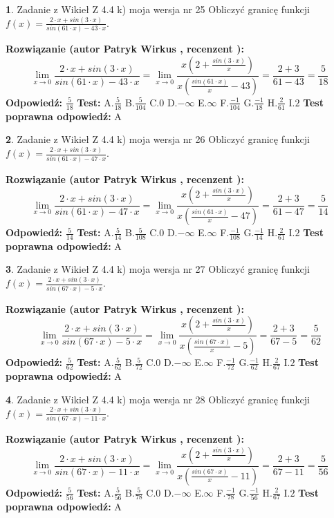 \documentclass[12pt, a4paper]{article}
\theoremstyle{definition} %
\newtheorem{zad}{}
\newcommand{\zadStart}[1]{\begin{zad}#1\newline}
\newcommand{\zadStop}{\end{zad}}
\newcommand{\rozwStart}[2]{\noindent \textbf{Rozwiązanie (autor #1 , recenzent #2): }\newline}
\newcommand{\rozwStop}{\newline}
\newcommand{\odpStart}{\noindent \textbf{Odpowiedź:}\newline}
\newcommand{\odpStop}{\newline}
\newcommand{\testStart}{\noindent \textbf{Test:}\newline}
\newcommand{\testStop}{\newline}
\newcommand{\kluczStart}{\noindent \textbf{Test poprawna odpowiedź:}\newline}
\newcommand{\kluczStop}{\newline}
\begin{document}
\zadStart{Zadanie z Wikieł Z 4.4 k) moja wersja nr 25}
Obliczyć granicę funkcji $f(x)=\frac{2\cdot x +sin(3\cdot x)}{sin(61\cdot x) -43\cdot x}$.
\zadStop
\rozwStart{Patryk Wirkus}{}
$$\lim\limits_{x\to 0}\frac{2\cdot x +sin(3\cdot x)}{sin(61\cdot x) -43\cdot x}
=\lim\limits_{x\to 0}\frac{x(2+\frac{sin(3\cdot x)}{x})}{x(\frac{sin(61\cdot x)}{x}-43)}
=\frac{2+3}{61-43} = \frac{5}{18}$$
\rozwStop
\odpStart
$\frac{5}{18}$
\odpStop
\testStart
A.$\frac{5}{18}$
B.$\frac{5}{104}$
C.$0$
D.$-\infty$
E.$\infty$
F.$\frac{-1}{104}$
G.$\frac{-1}{18}$
H.$\frac{2}{61}$
I.$2$
\testStop
\kluczStart
A
\kluczStop



\zadStart{Zadanie z Wikieł Z 4.4 k) moja wersja nr 26}
Obliczyć granicę funkcji $f(x)=\frac{2\cdot x +sin(3\cdot x)}{sin(61\cdot x) -47\cdot x}$.
\zadStop
\rozwStart{Patryk Wirkus}{}
$$\lim\limits_{x\to 0}\frac{2\cdot x +sin(3\cdot x)}{sin(61\cdot x) -47\cdot x}
=\lim\limits_{x\to 0}\frac{x(2+\frac{sin(3\cdot x)}{x})}{x(\frac{sin(61\cdot x)}{x}-47)}
=\frac{2+3}{61-47} = \frac{5}{14}$$
\rozwStop
\odpStart
$\frac{5}{14}$
\odpStop
\testStart
A.$\frac{5}{14}$
B.$\frac{5}{108}$
C.$0$
D.$-\infty$
E.$\infty$
F.$\frac{-1}{108}$
G.$\frac{-1}{14}$
H.$\frac{2}{61}$
I.$2$
\testStop
\kluczStart
A
\kluczStop



\zadStart{Zadanie z Wikieł Z 4.4 k) moja wersja nr 27}
Obliczyć granicę funkcji $f(x)=\frac{2\cdot x +sin(3\cdot x)}{sin(67\cdot x) -5\cdot x}$.
\zadStop
\rozwStart{Patryk Wirkus}{}
$$\lim\limits_{x\to 0}\frac{2\cdot x +sin(3\cdot x)}{sin(67\cdot x) -5\cdot x}
=\lim\limits_{x\to 0}\frac{x(2+\frac{sin(3\cdot x)}{x})}{x(\frac{sin(67\cdot x)}{x}-5)}
=\frac{2+3}{67-5} = \frac{5}{62}$$
\rozwStop
\odpStart
$\frac{5}{62}$
\odpStop
\testStart
A.$\frac{5}{62}$
B.$\frac{5}{72}$
C.$0$
D.$-\infty$
E.$\infty$
F.$\frac{-1}{72}$
G.$\frac{-1}{62}$
H.$\frac{2}{67}$
I.$2$
\testStop
\kluczStart
A
\kluczStop



\zadStart{Zadanie z Wikieł Z 4.4 k) moja wersja nr 28}
Obliczyć granicę funkcji $f(x)=\frac{2\cdot x +sin(3\cdot x)}{sin(67\cdot x) -11\cdot x}$.
\zadStop
\rozwStart{Patryk Wirkus}{}
$$\lim\limits_{x\to 0}\frac{2\cdot x +sin(3\cdot x)}{sin(67\cdot x) -11\cdot x}
=\lim\limits_{x\to 0}\frac{x(2+\frac{sin(3\cdot x)}{x})}{x(\frac{sin(67\cdot x)}{x}-11)}
=\frac{2+3}{67-11} = \frac{5}{56}$$
\rozwStop
\odpStart
$\frac{5}{56}$
\odpStop
\testStart
A.$\frac{5}{56}$
B.$\frac{5}{78}$
C.$0$
D.$-\infty$
E.$\infty$
F.$\frac{-1}{78}$
G.$\frac{-1}{56}$
H.$\frac{2}{67}$
I.$2$
\testStop
\kluczStart
A
\kluczStop
\end{document}
